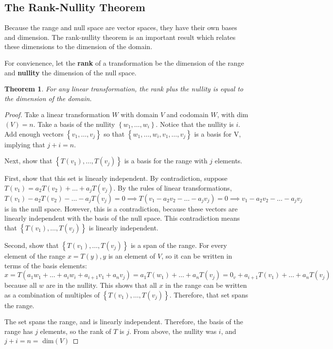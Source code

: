 \documentclass{article}
\newtheorem*{theorem}{Theorem}
\begin{document}
        \subsection{The Rank-Nullity Theorem}
            Because the range and null space are vector spaces, they have their own bases and dimension. The rank-nullity theorem is an important result which relates these dimensions to the dimension of the domain.

            For convienence, let the \textbf{rank} of a transformation be the dimension of the range and \textbf{nullity} the dimension of the null space.
            \begin{theorem}
                For any linear transformation, the rank plus the nullity is equal to the dimension of the domain.
            \end{theorem}
            \begin{proof}
                Take a linear transformation $W$ with domain $V$ and codomain $W$, with dim$(V) = n$. Take a basis of the nullity $\left\{w_1, \dots, w_i\right\}$. Notice that the nullity is $i$. Add enough vectors $\left\{v_1, \dots, v_j\right\}$ so that $\left\{w_1, \dots, w_i, v_1, \dots, v_j \right\}$ is a basis for V, implying that $j + i = n$. 
                
                Next, show that $\left\{T(v_1), \dots, T(v_j)\right\}$ is a basis for the range with $j$ elements. 

                First, show that this set is linearly independent. By contradiction, suppose $T(v_1) = a_2T(v_2) + \dots + a_jT(v_j)$. 
                By the rules of linear transformations, $T(v_1) - a_2T(v_2) - \dots - a_jT(v_j) = 0 \implies T(v_1 - a_2v_2 - \dots - a_jv_j) = 0 \implies v_1 - a_2v_2 - \dots - a_jv_j $ is in the null space. However, this is a contradiction, because these vectors are linearly independent with the basis of the null space. This contradiction means that $\left\{T(v_1), \dots, T(v_j)\right\}$ is linearly independent.

                Second, show that $\left\{T(v_1), \dots, T(v_j)\right\}$ is a span of the range. For every element of the range $x = T(y), y$ is an element of $V$, so it can be written in terms of the basis elements: $x = T(a_1w_1 + \dots + a_iw_i + a_{i+1}v_1 + a_n v_j) = a_1T(w_1) + \dots + a_nT(v_j) = 0_v + a_{i+1}T(v_1) + \dots + a_nT(v_j)$ because all $w$ are in the nullity. This shows that all $x$ in the range can be written as a combination of multiples of $\left\{T(v_1), \dots, T(v_j)\right\}$. Therefore, that set spans the range.

                The set spans the range, and is linearly independent. Therefore, the basis of the range has $j$ elements, so the rank of $T$ is $j$. From above, the nullity was $i$, and $j+i=n = $ dim$(V)$
            \end{proof}
\end{document}
